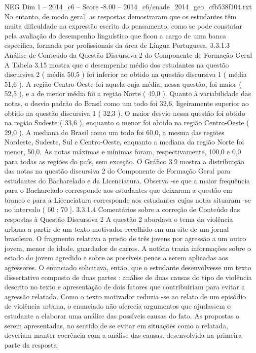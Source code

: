 \begin{textsample}{NEG Dim 1 – 2014\_c6 – Score -8.00 – 2014\_c6/enade\_2014\_geo\_cfb538f104.txt}
No entanto, de modo geral, as respostas demostraram que os estudantes têm muita dificuldade na expressão escrita do pensamento, como se pode constatar pela avaliação do desempenho linguístico que ficou a cargo de uma banca específica, formada por profissionais da área de Língua Portuguesa. 3.3.1.3 Análise de Conteúdo da Questão Discursiva 2 do Componente de Formação Geral A Tabela 3.15 mostra que o desempenho médio dos estudantes na questão discursiva 2 ( média 50,5 ) foi inferior ao obtido na questão discursiva 1 ( média 51,6 ).
A região Centro-Oeste foi aquela cuja média, nessa questão, foi maior ( 52,5 ), e a de menor média foi a região Norte ( 49,0 ).
Quanto à variabilidade das notas, o desvio padrão do Brasil como um todo foi 32,6, ligeiramente superior ao obtido na questão discursiva 1 ( 32,3 ).
O maior desvio nessa questão foi obtido na região Sudeste ( 33,6 ), enquanto o menor foi obtido na região Centro-Oeste ( 29,0 ).
A mediana do Brasil como um todo foi 60,0, a mesma das regiões Nordeste, Sudeste, Sul e Centro-Oeste, enquanto a mediana da região Norte foi menor, 50,0.
As notas máximas e mínimas foram, respectivamente, 100,0 e 0,0 para todas as regiões do país, sem exceção.
O Gráfico 3.9 mostra a distribuição das notas na questão discursiva 2 do Componente de Formação Geral para estudantes do Bacharelado e da Licenciatura.
Observa -se que a maior frequência para o Bacharelado corresponde aos estudantes que deixaram a questão em branco e para a Licenciatura corresponde aos estudantes cujas notas situaram -se no intervalo ( 60 ; 70 ]. 3.3.1.4 Comentários sobre a correção de Conteúdo das respostas à Questão Discursiva 2 A questão 2 abordava o tema da violência urbana a partir de um texto motivador recolhido em um site de um jornal brasileiro.
O fragmento relatava a prisão de três jovens por agressão a um outro jovem, menor de idade, guardador de carros.
A notícia trazia informações sobre o estado do jovem agredido e sobre as possíveis penas a serem aplicadas aos agressores.
O enunciado solicitava, então, que o estudante desenvolvesse um texto dissertativo composto de duas partes : análise de duas causas do tipo de violência descrito no texto e apresentação de dois fatores que contribuiriam para evitar a agressão relatada.
Como o texto motivador reduzia -se ao relato de um episódio de violência urbana, o enunciado não oferecia argumentos que ajudassem o estudante a elaborar uma análise das possíveis causas do fato.
As propostas a serem apresentadas, no sentido de se evitar em situações como a relatada, deveriam manter coerência com a análise das causas, desenvolvida na primeira parte da resposta.

\end{textsample}
